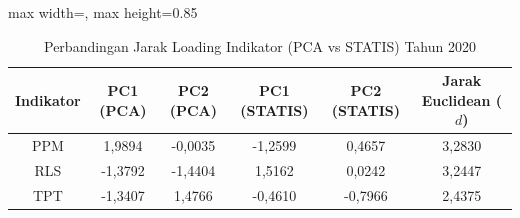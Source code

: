 \begin{table}[H]
\centering
\caption{Perbandingan Jarak Loading Indikator (PCA vs STATIS) Tahun 2020} \label{tab:sample1jarak_loading_2020}
\begin{adjustbox}{max width=\textwidth, max height=0.85\textheight}
\begin{tabular}{|c|c|c|c|c|c|}
\hline
\textbf{Indikator} & \textbf{PC1 (PCA)} & \textbf{PC2 (PCA)} & \textbf{PC1 (STATIS)} & \textbf{PC2 (STATIS)} & \textbf{Jarak Euclidean ($d$)} \\
\hline
PPM & 1,9894 & -0,0035 & -1,2599 & 0,4657 & 3,2830 \\
RLS & -1,3792 & -1,4404 & 1,5162 & 0,0242 & 3,2447 \\
TPT & -1,3407 & 1,4766 & -0,4610 & -0,7966 & 2,4375 \\
\hline
\end{tabular}
\end{adjustbox}
\end{table}